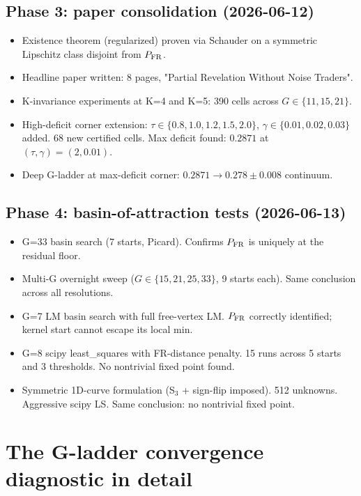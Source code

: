 \documentclass[11pt]{article}
\newcommand{\1}{\mathbf{1}}
\newcommand{\PFR}{P_{\rm FR}}
\begin{document}
\subsection{Phase 3: paper consolidation (2026-06-12)}

\begin{itemize}
\item Existence theorem (regularized) proven via Schauder on a symmetric
Lipschitz class disjoint from $\PFR$.
\item Headline paper written: 8 pages, "Partial Revelation Without Noise Traders".
\item K-invariance experiments at K=4 and K=5: 390 cells across $G \in \{11, 15, 21\}$.
\item High-deficit corner extension: $\tau \in \{0.8, 1.0, 1.2, 1.5, 2.0\}$, $\gamma \in
\{0.01, 0.02, 0.03\}$ added. 68 new certified cells. Max deficit found:
$0.2871$ at $(\tau, \gamma) = (2, 0.01)$.
\item Deep G-ladder at max-deficit corner: $0.2871 \to 0.278 \pm 0.008$ continuum.
\end{itemize}

\subsection{Phase 4: basin-of-attraction tests (2026-06-13)}

\begin{itemize}
\item G=33 basin search (7 starts, Picard). Confirms $\PFR$ is uniquely at
the residual floor.
\item Multi-G overnight sweep ($G \in \{15, 21, 25, 33\}$, 9 starts each). Same
conclusion across all resolutions.
\item G=7 LM basin search with full free-vertex LM. $\PFR$ correctly
identified; kernel start cannot escape its local min.
\item G=8 scipy least\_squares with FR-distance penalty. 15 runs across 5
starts and 3 thresholds. No nontrivial fixed point found.
\item Symmetric 1D-curve formulation (S$_3$ + sign-flip imposed). 512
unknowns. Aggressive scipy LS. Same conclusion: no nontrivial fixed point.
\end{itemize}

\section{The G-ladder convergence diagnostic in detail}
\end{document}
